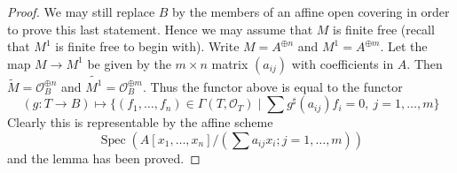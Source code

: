 \documentclass{stacks-project}
\theoremstyle{plain}
\theoremstyle{definition}
\theoremstyle{remark}
\numberwithin{equation}{subsection}
\def\Spec{\mathop{\mathrm{Spec}}}
\begin{document}
\begin{proof}
\medskip\noindent
We may still replace $B$ by the members of an affine open covering
in order to prove this last statement. Hence we may assume that $M$
is finite free (recall that $M^1$ is finite free to begin with).
Write $M = A^{\oplus n}$ and $M^1 = A^{\oplus m}$. Let the map
$M \to M^1$ be given by the $m \times n$ matrix $(a_{ij})$ with
coefficients in $A$. Then $\widetilde{M} = \mathcal{O}_B^{\oplus n}$
and $\widetilde{M^1} = \mathcal{O}_B^{\oplus m}$. Thus the functor
above is equal to the functor
$$
(g : T \to B) \longmapsto
\{(f_1, \ldots, f_n) \in \Gamma(T, \mathcal{O}_T) \mid
\sum g^\sharp(a_{ij})f_i = 0,\ j = 1, \ldots, m\}
$$
Clearly this is representable by the affine scheme
$$
\Spec\left(A[x_1, \ldots, x_n]/(\sum a_{ij}x_i; j = 1, \ldots, m)\right)
$$
and the lemma has been proved.
\end{proof}
\end{document}
